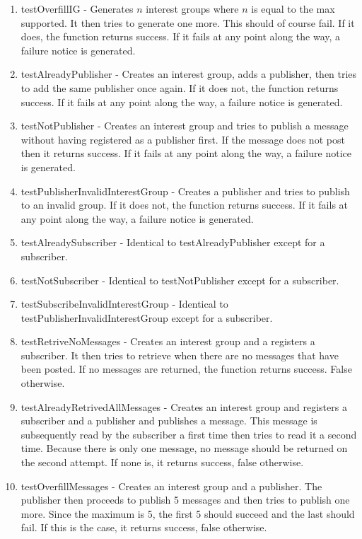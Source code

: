\documentclass{article}
\begin{document}
\begin{enumerate}
	\item testOverfillIG - Generates $ n $ interest groups where $ n $ is equal to the max supported.  It then tries to generate one more.  This should of course fail.  If it does, the function returns success.  If it fails at any point along the way, a failure notice is generated.
	\item testAlreadyPublisher - Creates an interest group, adds a publisher, then tries to add the same publisher once again.  If it does not, the function returns success.  If it fails at any point along the way, a failure notice is generated.
	\item testNotPublisher - Creates an interest group and tries to publish a message without having registered as a publisher first.  If the message does not post then it returns success. If it fails at any point along the way, a failure notice is generated.
	\item testPublisherInvalidInterestGroup - Creates a publisher and tries to publish to an invalid group.  If it does not, the function returns success.  If it fails at any point along the way, a failure notice is generated.
	\item testAlreadySubscriber - Identical to testAlreadyPublisher except for a subscriber.
	\item testNotSubscriber - Identical to testNotPublisher except for a subscriber.
	\item testSubscribeInvalidInterestGroup - Identical to testPublisherInvalidInterestGroup except for a subscriber.
	\item testRetriveNoMessages - Creates an interest group and a registers a subscriber.  It then tries to retrieve when there are no messages that have been posted.  If no messages are returned, the function returns success.  False otherwise.
	\item testAlreadyRetrivedAllMessages - Creates an interest group and registers a subscriber and a publisher and publishes a message.  This message is subsequently read by the subscriber a first time then tries to read it a second time.  Because there is only one message, no message should be returned on the second attempt.  If none is, it returns success, false otherwise.
	\item testOverfillMessages - Creates an interest group and a publisher.  The publisher then proceeds to publish 5 messages and then tries to publish one more.  Since the maximum is 5, the first 5 should succeed and the last should fail.  If this is the case, it returns success, false otherwise.

\end{enumerate}
\end{document}
